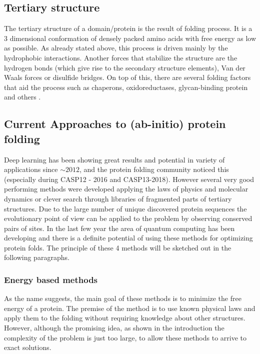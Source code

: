 \subsection{Tertiary structure}

The tertiary structure of a domain/protein is the result of folding process. It is a 3 dimensional conformation of densely packed amino acids with free energy as low as possible. As already stated above, this process is driven mainly by the hydrophobic interactions. Another forces that stabilize the structure are the hydrogen bonds (which give rise to the secondary structure elements), Van der Waals forces or disulfide bridges. On top of this, there are several folding factors that aid the process such as chaperons, oxidoreductases, glycan-binding protein and others \cite{principles_of_pf}.

\subsection{Current Approaches to (ab-initio) protein folding}

Deep learning has been showing great results and potential in variety of applications since $\sim2012$, and the protein folding community noticed this (especially during CASP12 - 2016 and CASP13-2018). However several very good performing methods were developed applying the laws of physics and molecular dynamics or clever search through libraries of fragmented parts of tertiary structures. Due to the large number of unique discovered protein sequences the evolutionary point of view can be applied to the problem by observing conserved pairs of sites. In the last few year the area of quantum computing has been developing and there is a definite potential of using these methods for optimizing protein folds. The principle of these 4 methods will be sketched out in the following paragraphs.

\subsubsection{Energy based methods}

As the name suggests, the main goal of these methods is to minimize the free energy of a protein. The premise of the method is to use known physical laws and apply them to the folding without requiring knowledge about other structures. However, although the promising idea, as shown in the introduction the complexity of the problem is just too large, to allow these methods to arrive to exact solutions.

